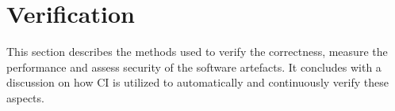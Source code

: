 
\section{Verification}
\label{sec:verification}

This section describes the methods used to verify the correctness, measure the performance and assess security of the software artefacts. It concludes with a discussion on how CI is utilized to automatically and continuously verify these aspects.






